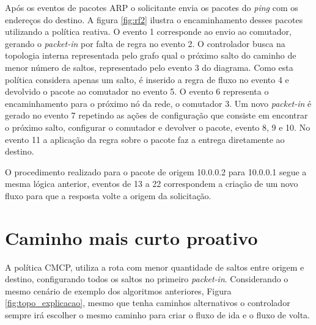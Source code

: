 Após os eventos de pacotes ARP o solicitante envia os pacotes do \emph{ping} com os endereços do destino. A figura \ref{fig:rf2} ilustra o encaminhamento desses pacotes utilizando a política reativa. O evento 1 corresponde ao envio ao comutador, gerando o \emph{packet-in} por falta de regra no evento 2. O controlador busca na topologia interna representada pelo grafo qual o próximo salto do caminho de menor número de saltos, representado pelo evento 3 do diagrama. Como esta política considera apenas um salto, é inserido a regra de fluxo no evento 4 e devolvido o pacote ao comutador no evento 5. O evento 6 representa o encaminhamento para o próximo nó da rede, o comutador 3.
Um novo \emph{packet-in} é gerado no evento 7 repetindo as ações de configuração que consiste em encontrar o próximo salto, configurar o comutador e devolver o pacote, evento 8, 9 e 10. No evento 11 a aplicação da regra sobre o pacote faz a entrega diretamente ao destino. 

O procedimento realizado para o pacote de origem 10.0.0.2 para 10.0.0.1 segue a mesma lógica anterior, eventos de 13 a 22 correspondem a criação de um novo fluxo para que a resposta volte a origem da solicitação. 

\section{Caminho mais curto proativo}
\label{sec:pf}

A política CMCP, utiliza a rota com menor quantidade de saltos entre origem e destino, configurando todos os saltos no primeiro \textit{packet-in}. Considerando o mesmo cenário de exemplo dos algoritmos anteriores, Figura \ref{fig:topo_explicacao}, mesmo que tenha caminhos alternativos o controlador sempre irá escolher o mesmo caminho para criar o fluxo de ida e o fluxo de volta. 

